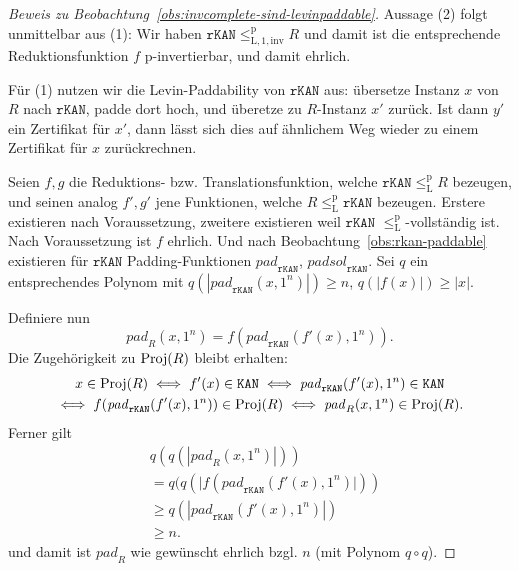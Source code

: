 \medskip
\begin{proof}[Beweis zu Beobachtung~\ref{obs:invcomplete-sind-levinpaddable}]
    Aussage (2) folgt unmittelbar aus (1): Wir haben $\mathtt{rKAN}\leq_\mathrm{L,1,inv}^\mathrm{p} R$ und damit ist die entsprechende Reduktionsfunktion $f$ p-invertierbar, und damit ehrlich.

    Für (1) nutzen wir die Levin-Paddability von $\mathtt{rKAN}$ aus: übersetze Instanz $x$ von $R$ nach $\mathtt{rKAN}$, padde dort hoch, und überetze zu $R$-Instanz $x'$ zurück. Ist dann $y'$ ein Zertifikat für $x'$, dann lässt sich dies auf ähnlichem Weg wieder zu einem Zertifikat für $x$ zurückrechnen.

    Seien $f, g$ die Reduktions- bzw. Translationsfunktion, welche $\mathtt{rKAN}\leq_\mathrm{L}^\mathrm p R$ bezeugen, und seinen analog $f', g'$ jene Funktionen, welche $R\leq_\mathrm{L}^\mathrm p \mathtt{rKAN}$ bezeugen. Erstere existieren nach Voraussetzung, zweitere existieren weil $\mathtt{rKAN}$ $\leq_\mathrm{L}^\mathrm p$-vollständig ist.
    Nach Voraussetzung ist $f$ ehrlich. %
    Und nach Beobachtung~\ref{obs:rkan-paddable} existieren für $\mathtt{rKAN}$ Padding-Funktionen $\mathit{pad}_\mathtt{rKAN}$, $\mathit{padsol}_\mathtt{rKAN}$.
    Sei $q$ ein entsprechendes Polynom mit $q(|\mathit{pad}_\mathtt{rKAN}(x, 1^n)|)\geq n$, $q(|f(x)|) \geq |x|$.

    Definiere nun
    \[ \mathit{pad}_R(x, 1^n) = f(\mathit{pad}_\mathtt{rKAN}(f'(x), 1^n)). \]
    Die Zugehörigkeit zu $\operatorname{Proj}(R)$ bleibt erhalten:
    \begin{multline*}
        x\in \operatorname{Proj}(R) \iff f'(x) \in \mathtt{KAN} \iff \mathit{pad}_\mathtt{rKAN}(f'(x), 1^n) \in \mathtt{KAN}\\ \iff f(\mathit{pad}_\mathtt{rKAN}(f'(x), 1^n)) \in \operatorname{Proj}(R) \iff \mathit{pad}_R(x, 1^n) \in\operatorname{Proj}(R).
    \end{multline*}
    Ferner gilt
    \begin{align*} &q(q(|\mathit{pad}_R(x, 1^n)|)) \\&= q(q(|f(\mathit{pad}_\mathtt{rKAN}(f'(x), 1^n)|))\\&\geq q(|\mathit{pad}_\mathtt{rKAN}(f'(x), 1^n)|)\\ &\geq n.
    \end{align*}
    und damit ist $\mathit{pad}_R$ wie gewünscht ehrlich bzgl. $n$ (mit Polynom $q\circ q$).


\end{proof}
